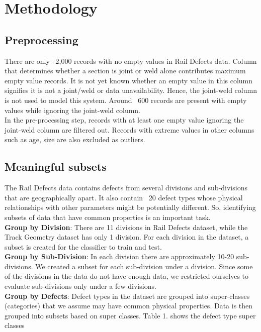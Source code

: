 \documentclass{sig-alternate-05-2015}
\begin{document}
\section{Methodology}

\subsection{Preprocessing}
There are only ~2,000 records with no empty values in Rail Defects data. Column that determines whether a section is joint or weld alone contributes maximum empty value records. It is not yet known whether an empty value in this column signifies it is not a joint/weld or data unavailability. Hence, the joint-weld column is not used to model this system. Around ~600 records are present with empty values while ignoring the joint-weld column. \\

In the pre-processing step, records with at least one empty value ignoring the joint-weld column are filtered out. Records with extreme values in other columns such as age, size are also excluded as outliers.\\

\subsection{Meaningful subsets}
The Rail Defects data contains defects from several divisions and sub-divisions that are geographically apart. It also contain ~20 defect types whose physical relationships with other parameters might be potentially different. So, identifying subsets of data that have common properties is an important task. \\

\textbf{Group by Division}: There are 11 divisions in Rail Defects dataset, while the Track Geometry dataset has only 1 division. For each division in the dataset, a subset is created for the classifier to train and test. \\ 

\textbf{Group by Sub-Division}: In each division there are approximately 10-20 sub-divisions. We created a subset for each sub-division under a division. Since some of the divisions in the data do not have enough data, we restricted ourselves to evaluate sub-divisions only under a few divisions. \\

\textbf{Group by Defects}: Defect types in the dataset are grouped into super-classes (categories) that we assume may have common physical properties. Data is then grouped into subsets based on super classes. Table 1. shows the defect type super classes \\
\end{document}
